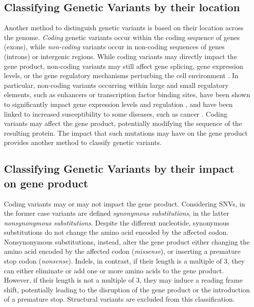 \documentclass[a4paper, titlepage, openright]{book}
\begin{document}
\subsection{Classifying Genetic Variants by their location}
Another method to distinguish genetic variants is based on their location across the genome. \emph{Coding} genetic variants occur within the coding sequence of genes (exons), while \emph{non-coding} variants occur in non-coding sequences of genes (introns) or intergenic regions. While coding variants may directly impact the gene product, non-coding variants may still affect gene splicing, gene expression levels, or the gene regulatory mechanisms perturbing the cell environment \cite{li2016rna, maurano2015large}. In particular, non-coding variants occurring within large and small regulatory elements, such as enhancers or transcription factor binding sites, have been shown to significantly impact gene expression levels and regulation \citep{de2006regulatory, wienert2015editing}, and have been linked to increased susceptibility to some diseases, such as cancer \citep{weinhold2014genome}. Coding variants may affect the gene product, potentially modifying the sequence of the resulting protein. The impact that such mutations may have on the gene product provides another method to classify genetic variants.

\subsection{Classifying Genetic Variants by their impact on gene product}
Coding variants may or may not impact the gene product. Considering SNVs, in the former case variants are defined \emph{synonymous substitutions}, in the latter \emph{nonsynonymous substitutions}. Despite the different nucleotide, synonymous substitutions do not change the amino acid encoded by the affected codon. Nonsynonymous substitutions, instead, alter the gene product either changing the amino acid encoded by the affected codon (\emph{missense}), or inserting a premature stop codon (\emph{nonsense}). Indels, in contrast, if their length is a multiple of 3, they can either eliminate or add one or more amino acids to the gene product. However, if their length is not a multiple of 3, they may induce a reading frame shift, potentially leading to the disruption of the gene product or the introduction of a premature stop. Structural variants are excluded from this classification.
\end{document}
